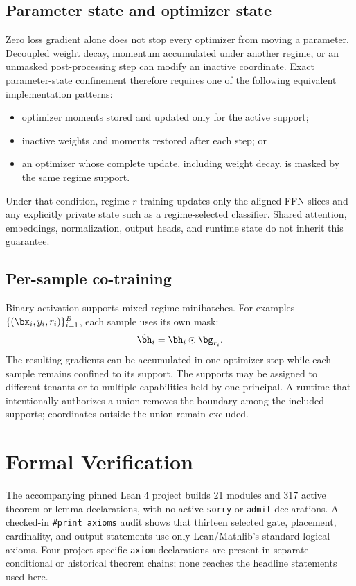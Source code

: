 \documentclass[11pt]{article}
\begin{document}
\subsection{Parameter state and optimizer state}

Zero loss gradient alone does not stop every optimizer from moving a parameter.
Decoupled weight decay, momentum accumulated under another regime, or an
unmasked post-processing step can modify an inactive coordinate. Exact
parameter-state confinement therefore requires one of the following equivalent
implementation patterns:
\begin{itemize}
  \item optimizer moments stored and updated only for the active support;
  \item inactive weights and moments restored after each step; or
  \item an optimizer whose complete update, including weight decay, is masked
  by the same regime support.
\end{itemize}

Under that condition, regime-$r$ training updates only the aligned FFN slices
and any explicitly private state such as a regime-selected classifier. Shared
attention, embeddings, normalization, output heads, and runtime state do not
inherit this guarantee.

\subsection{Per-sample co-training}

Binary activation supports mixed-regime minibatches. For examples
$\{(\bx_i,y_i,r_i)\}_{i=1}^B$, each sample uses its own mask:
\begin{equation}
  \tilde{\bh}_i=\bh_i\odot\bg_{r_i}.
\end{equation}
The resulting gradients can be accumulated in one optimizer step while each
sample remains confined to its support. The supports may be assigned to
different tenants or to multiple capabilities held by one principal. A runtime
that intentionally authorizes a union removes the boundary among the included
supports; coordinates outside the union remain excluded.

\section{Formal Verification}

The accompanying pinned Lean 4 project builds 21 modules and 317 active theorem or
lemma declarations, with no active \texttt{sorry} or \texttt{admit}
declarations. A checked-in \texttt{\#print axioms} audit shows that thirteen
selected gate, placement, cardinality, and output statements use only
Lean/Mathlib's standard logical axioms. Four project-specific \texttt{axiom}
declarations are present
in separate conditional or historical theorem chains; none reaches the
headline statements used here.
\end{document}
